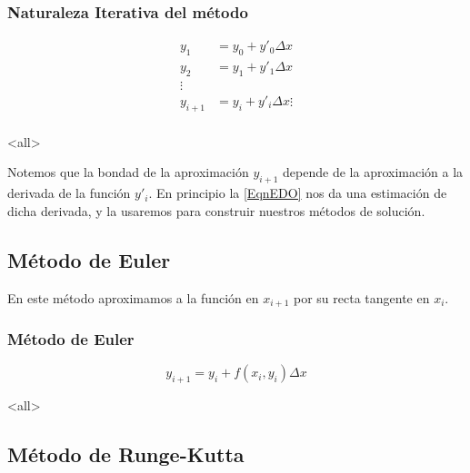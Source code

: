 \mode*
\begin{frame}[label=FrameIteraciones]
  \frametitle<presentation>{Naturaleza Iterativa del método}

\begin{equation}\label{EqnItera}
  \begin{aligned}
    y_1 &= y_0 + y'_0 \Delta x\\
    y_2 &= y_1 + y'_1 \Delta x\\
    \vdots \\
    y_{i+1} &= y_i + y'_i \Delta x
    \vdots \\
  \end{aligned}
\end{equation}

\end{frame}
\mode<all>

Notemos que la bondad de la aproximación $y_{i+1}$ depende de la aproximación a la derivada de la 
función $y'_i$. En principio la \autoref{EqnEDO} nos da una estimación de dicha derivada, y la 
usaremos para construir nuestros métodos de solución. 

\subsection{Método de Euler}

En este método aproximamos a la función en $x_{i+1}$ por su recta tangente en $x_{i}$. 

\mode*

\begin{frame}[label=FrameMetodoEuler]
  \frametitle<presentation>{Método de Euler}
  \begin{equation}
    y_{i+1} = y_i + f(x_i, y_i ) \Delta x
  \end{equation}
\end{frame}
\mode<all>


\subsection{Método de Runge-Kutta}

